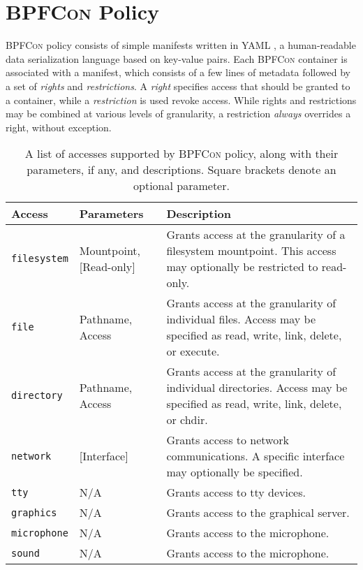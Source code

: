 \documentclass[dvipsnames, 12pt]{article}
\def\bpfcon{\textsc{BPFCon}}
\begin{document}
\section{\bpfcon{} Policy}
\label{sec:policy}

\bpfcon{} policy consists of simple manifests written in YAML \cite{yaml},
a human-readable data serialization language based on key-value pairs.  Each
\bpfcon{} container is associated with a manifest, which consists of a few lines
of metadata followed by a set of \textit{rights} and \textit{restrictions}.
A \textit{right} specifies access that should be granted to a container, while
a \textit{restriction} is used revoke access. While rights and restrictions may
be combined at various levels of granularity, a restriction \textit{always}
overrides a right, without exception.

\begin{table}[htpb]
  \centering
  \caption{
    A list of accesses supported by \bpfcon{} policy, along with their
    parameters, if any, and descriptions. Square brackets denote an optional
    parameter.
  }
  \label{tab:label}
  \begin{tabular}{llp{20em}}
  \toprule
  Access              & Parameters              & Description \\
  \midrule
  \texttt{filesystem} & Mountpoint, [Read-only] &
    Grants access at the granularity of a filesystem mountpoint.
    This access may optionally be restricted to read-only. \\
  \texttt{file}       & Pathname, Access        &
    Grants access at the granularity of individual files.
    Access may be specified as read, write, link, delete, or execute. \\
  \texttt{directory}  & Pathname, Access        &
    Grants access at the granularity of individual directories.
    Access may be specified as read, write, link, delete, or chdir. \\
  \texttt{network}    & [Interface]             &
    Grants access to network communications.
    A specific interface may optionally be specified. \\
  \texttt{tty}        & N/A                     &
    Grants access to tty devices. \\
  \texttt{graphics}   & N/A                     &
    Grants access to the graphical server. \\
  \texttt{microphone} & N/A                     &
    Grants access to the microphone. \\
  \texttt{sound}      & N/A                     &
    Grants access to the microphone. \\
  \bottomrule
  \end{tabular}
\end{table}
\end{document}
